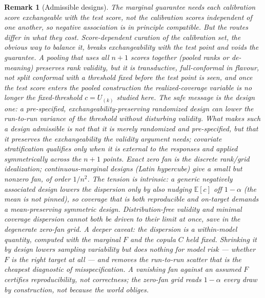 \documentclass[11pt]{article}
\newtheorem{remark}{Remark}
\begin{document}
\begin{remark}[Admissible designs]
The marginal guarantee needs each calibration score exchangeable with the test score, not the
calibration scores independent of one another, so negative association is in principle compatible. But
the routes differ in what they cost. Score-dependent curation of the calibration set, the obvious way
to balance it, breaks exchangeability with the test point and voids the guarantee. A pooling that uses
all $n+1$ scores together (pooled ranks or de-meaning) preserves rank validity, but it is
transductive, full-conformal in flavour, not split conformal with a threshold fixed before the test
point is seen, and once the test score enters the pooled construction the realized-coverage variable
is no longer the fixed-threshold $c=U_{(k)}$ studied here. The safe message is the design one: a
pre-specified, exchangeability-preserving randomized design can lower the run-to-run variance of the
threshold without disturbing validity. What makes such a design admissible is not that it is merely
randomized and pre-specified, but that it preserves the exchangeability the validity argument needs;
covariate stratification qualifies only when it is external to the responses and applied symmetrically
across the $n+1$ points. Exact zero fan is the discrete rank/grid idealization; continuous-marginal
designs (Latin hypercube) give a small but nonzero fan, of order $1/n^2$. The tension is intrinsic: a
generic negatively associated design lowers the dispersion only by also nudging $\mathbb E[c]$ off
$1-\alpha$ (the mean is not pinned), so coverage that is both reproducible \emph{and} on-target demands
a \emph{mean-preserving} symmetric design. Distribution-free validity and minimal coverage dispersion
cannot both be driven to their limit at once, save in the degenerate zero-fan grid.
A deeper caveat: the dispersion is a \emph{within-model} quantity, computed with the marginal $F$ and
the copula $C$ held fixed. Shrinking it by design lowers sampling variability but does nothing for
model risk --- whether $F$ is the right target at all --- and removes the run-to-run scatter that is
the cheapest diagnostic of misspecification. A vanishing fan against an assumed $F$ certifies
reproducibility, not correctness; the zero-fan grid reads $1-\alpha$ every draw by construction, not
because the world obliges.
\end{remark}
\end{document}
